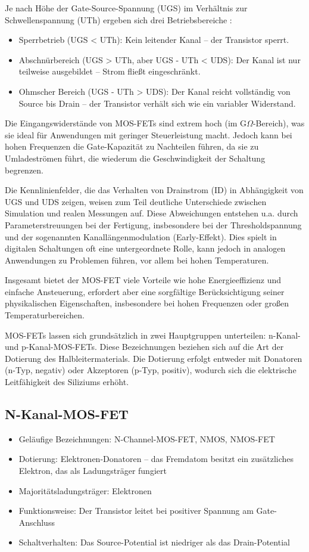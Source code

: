 Je nach Höhe der Gate-Source-Spannung (UGS) im Verhältnis zur Schwellenspannung (UTh) ergeben sich drei Betriebsbereiche \cite{Alles:2024}:
\begin{itemize}
	\item Sperrbetrieb (UGS < UTh): Kein leitender Kanal – der Transistor sperrt.
	\item Abschnürbereich (UGS > UTh, aber UGS - UTh < UDS): Der Kanal ist nur teilweise ausgebildet – Strom fließt eingeschränkt.
	\item Ohmscher Bereich (UGS - UTh > UDS): Der Kanal reicht vollständig von Source bis Drain – der Transistor verhält sich wie ein variabler Widerstand.
\end{itemize}
Die Eingangswiderstände von MOS-FETs sind extrem hoch (im G$\Omega$-Bereich), was sie ideal für Anwendungen mit geringer Steuerleistung macht. Jedoch kann bei hohen Frequenzen die Gate-Kapazität zu Nachteilen führen, da sie zu Umladeströmen führt, die wiederum die Geschwindigkeit der Schaltung begrenzen.\cite{Alles:2024}

Die Kennlinienfelder, die das Verhalten von Drainstrom (ID) in Abhängigkeit von UGS und UDS zeigen, weisen zum Teil deutliche Unterschiede zwischen Simulation und realen Messungen auf. Diese Abweichungen entstehen u.a. durch Parameterstreuungen bei der Fertigung, insbesondere bei der Thresholdspannung und der sogenannten Kanallängenmodulation (Early-Effekt). Dies spielt in digitalen Schaltungen oft eine untergeordnete Rolle, kann jedoch in analogen Anwendungen zu Problemen führen, vor allem bei hohen Temperaturen.\cite{Alles:2024}

Insgesamt bietet der MOS-FET viele Vorteile wie hohe Energieeffizienz und einfache Ansteuerung, erfordert aber eine sorgfältige Berücksichtigung seiner physikalischen Eigenschaften, insbesondere bei hohen Frequenzen oder großen Temperaturbereichen.\cite{Alles:2024}


MOS-FETs lassen sich grundsätzlich in zwei Hauptgruppen unterteilen: n-Kanal- und p-Kanal-MOS-FETs. Diese Bezeichnungen beziehen sich auf die Art der Dotierung des Halbleitermaterials. Die Dotierung erfolgt entweder mit Donatoren (n-Typ, negativ) oder Akzeptoren (p-Typ, positiv), wodurch sich die elektrische Leitfähigkeit des Siliziums erhöht. \cite{RSOnlineMOSFET:2025}

\subsection{N-Kanal-MOS-FET}
\begin{itemize}
	\item Geläufige Bezeichnungen: N-Channel-MOS-FET, NMOS, NMOS-FET
	\item Dotierung: Elektronen-Donatoren – das Fremdatom besitzt ein zusätzliches Elektron, das als Ladungsträger fungiert
	\item Majoritätsladungsträger: Elektronen
	\item Funktionsweise: Der Transistor leitet bei positiver Spannung am Gate-Anschluss
	\item Schaltverhalten: Das Source-Potential ist niedriger als das Drain-Potential
\end{itemize}

